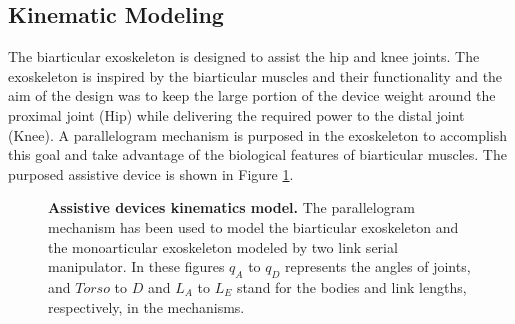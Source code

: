 \documentclass[10pt,letterpaper]{article}
\begin{document}
\subsection*{Kinematic Modeling}
The biarticular exoskeleton is designed to assist the hip and knee joints. The exoskeleton is inspired by the biarticular muscles and their functionality and the aim of the design was to keep the large portion of the device weight around the proximal joint (Hip) while delivering the required power to the distal joint (Knee). A parallelogram mechanism is purposed in the exoskeleton to accomplish this goal and take advantage of the biological features of biarticular muscles. The purposed assistive device is shown in Figure \ref{Fig_Exos_Kinematics_Model}.\\
\begin{figure}[h!]
	\centering
	\hfil
	\vspace{1mm}
	\caption{\small{\textbf{Assistive devices kinematics model.} The parallelogram mechanism has been used to model the biarticular exoskeleton and the monoarticular exoskeleton modeled by two link serial manipulator. In these figures $q_A$ to $q_D$ represents the angles of joints, and $Torso$ to $D$ and $L_A$ to $L_E$ stand for the bodies and link lengths, respectively, in the mechanisms.}}
	\label{Fig_Exos_Kinematics_Model}
\end{figure}
\end{document}
